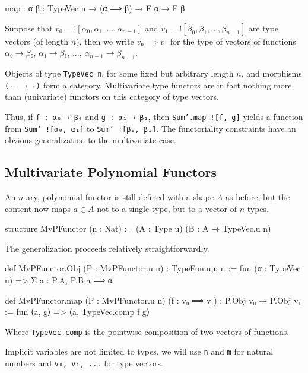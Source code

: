 \documentclass[titlepage]{report}
\newenvironment{remark}{%
\begin{framed}
\begin{trivlist}
    \item[\hskip \labelsep {\bfseries Remark:}]}%
{%
\end{trivlist}%
\end{framed}
}
\begin{document}
\begin{leancode}
    map : {α β : TypeVec n} → (α ⟹ β) → F α → F β
\end{leancode}
\begin{remark}
    Suppose that $v_0 = {!}[α_0, α_1, ..., α_{n-1}]$ and $v_1 = {!}[β_0, β_1, ..., β_{n-1}]$ are type vectors (of length $n$), then we write $v₀ ⟹ v₁$ for the type of vectors of functions $α₀ → β₀$, $α₁ → β₁$, ..., $α_{n-1} → β_{n-1}$.
\end{remark}
\begin{remark}
    Objects of type \texttt{TypeVec n}, for some fixed but arbitrary length $n$, and morphisms \texttt{(⋅ ⟹ ⋅)} form a category. 
    Multivariate type functors are in fact nothing more than (univariate) functors on this category of type vectors.
\end{remark}

Thus, if \texttt{f : α₀ → β₀} and \texttt{g : α₁ → β₁}, then \texttt{Sum'.map ![f, g]} yields a function from \texttt{Sum' ![α₀, α₁]} to \texttt{Sum' ![β₀, β₁]}.
The functoriality constraints have an obvious generalization to the multivariate case.

\subsection{Multivariate Polynomial Functors}
An $n$-ary, polynomial functor is still defined with a shape $A$ as before, but the content now maps $a ∈ A$ not to a single type, but to a vector of $n$ types.

\begin{leancode}
    structure MvPFunctor (n : Nat) := (A : Type u) (B : A → TypeVec.{u} n)
\end{leancode}

The generalization proceeds relatively straightforwardly.
\begin{leancode}
    def MvPFunctor.Obj (P : MvPFunctor.{u} n) : TypeFun.{u,u} n
        := fun (α : TypeVec n) => Σ a : P.A, P.B a ⟹ α

    def MvPFunctor.map  (P : MvPFunctor.{u} n) 
                        (f : v₀ ⟹ v₁) 
                            : P.Obj v₀ → P.Obj v₁ 
        := fun ⟨a, g⟩ => ⟨a, TypeVec.comp f g⟩
\end{leancode}

Where \texttt{TypeVec.comp} is the pointwise composition of two vectors of functions.

\begin{remark}
    Implicit variables are not limited to types, we will use \texttt{n} and \texttt{m} for natural numbers and \texttt{v₀, v₁, ...} for type vectors.
\end{remark}
\end{document}
